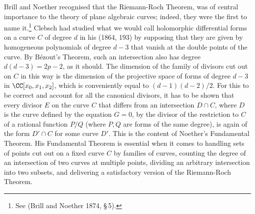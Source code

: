 Brill and Noether recognised that the Riemann-Roch Theorem, was of  central importance to the theory of plane algebraic curves; indeed, they were the first to name it.\footnote{See (Brill and Noether 1874, \S\,5).}  Clebsch had studied what we would call holomorphic differential forms on a curve $C$  of degree $d$ in his (1864, 193)  by supposing that they are given by homogeneous polynomials of degree $d-3$ that vanish at the double points of the curve. 
By B\'ezout's Theorem, such an intersection also has degree $d(d-3) = 2p-2$, as it should. The dimension of the family of divisors cut out on $C$ in this way is the dimension of the projective space of forms of degree $d-3$ in $\CC[x_0,x_1,x_2]$, which is conveniently equal to $(d-1)(d-2)/2$. For this to be correct and account for all the canonical divisors, it has to be shown that every divisor $E$ on the curve $C$ that differs from an intersection $D\cap C$, where $D$ is the curve defined by the equation $G = 0$,  by the divisor of the restriction to $C$ of a rational function $P/Q$ (where $P, Q$ are forms of the same degree), is again of the form $D'\cap C$ for some curve $D'$. This is the content of Noether's Fundamental Theorem. His Fundamental Theorem is essential when it comes  to handling  sets of points cut out on a fixed curve $C$ by families of curves, counting the degree of an intersection of two curves at multiple points,  dividing an arbitrary intersection into two subsets, and delivering a satisfactory version of the Riemann-Roch Theorem. 












 

